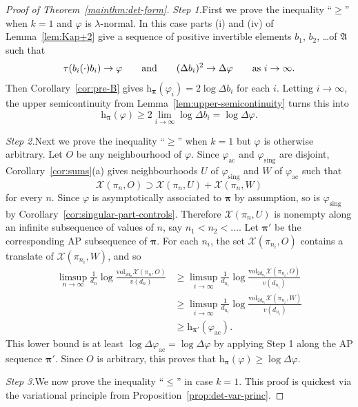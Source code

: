 \documentclass[12pt,a4paper]{article}
\numberwithin{equation}{section}
\theoremstyle{remark}
\renewcommand{\rm}[1]{\mathrm{#1}}
\newcommand{\rmh}{\mathrm{h}}
\newcommand{\X}{\mathcal{X}}
\newcommand{\A}{\mathfrak{A}}
\renewcommand{\phi}{\varphi}
\renewcommand{\l}{\lambda}
\newcommand{\bspi}{\boldsymbol{\pi}}
\newcommand{\vol}{\mathrm{vol}}
\begin{document}
\begin{proof}[Proof of Theorem~\ref{mainthm:det-form}]
\emph{Step 1.}\quad First we prove the inequality ``$\ge$'' when $k=1$ and $\phi$ is $\l$-normal.  In this case parts (i) and (iv) of Lemma~\ref{lem:Kap+2} give a sequence of positive invertible elements $b_1$, $b_2$, \dots of $\A$ such that
\[\tau(b_i(\cdot)b_i) \to \phi \qquad \hbox{and} \qquad (\Delta b_i)^2 \to \Delta \phi \qquad \hbox{as}\ i\to\infty.\]
Then Corollary~\ref{cor:pre-B} gives $\rmh_{\bspi}(\phi_i) = 2\log \Delta b_i$ for each $i$. Letting $i\to \infty$, the upper semicontinuity from Lemma~\ref{lem:upper-semicontinuity} turns this into
\[\rmh_{\bspi}(\phi) \ge 2\lim_{i\to\infty}\log \Delta b_i = \log \Delta \phi.\]

\emph{Step 2.}\quad Next we prove the inequality ``$\ge$'' when $k=1$ but $\phi$ is otherwise arbitrary.  Let $O$ be any neighbourhood of $\phi$.  Since $\phi_{\rm{ac}}$ and $\phi_{\rm{sing}}$ are disjoint,  Corollary~\ref{cor:sums}(a) gives neighbourhoods $U$ of $\phi_{\rm{sing}}$ and $W$ of $\phi_{\rm{ac}}$ such that
\[	\X(\pi_n,O) \supset \X(\pi_n,U) + \X(\pi_n,W)\]
for every $n$.  Since $\phi$ is asymptotically associated to $\bspi$ by assumption, so is $\phi_{\rm{sing}}$ by Corollary~\ref{cor:singular-part-controls}.  Therefore $\X(\pi_n,U)$ is nonempty along an infinite subsequence of values of $n$, say $n_1 < n_2 < \dots$.  Let $\bspi'$ be the corresponding AP subsequence of $\bspi$.  For each $n_i$, the set $\X(\pi_{n_i},O)$ contains a translate of $\X(\pi_{n_i},W)$, and so
\begin{align*}
\limsup_{n\to\infty}\frac{1}{d_n}\log \frac{\vol_{2d_n}\X(\pi_n,O)}{v(d_n)} &\ge\limsup_{i\to\infty}\frac{1}{d_{n_i}}\log \frac{\vol_{2d_{n_i}}\X(\pi_{n_i},O)}{v(d_{n_i})}\\
&\ge \limsup_{i\to\infty}\frac{1}{d_{n_i}}\log \frac{\vol_{2d_{n_i}}\X(\pi_{n_i},W)}{v(d_{n_i})} \\
&\ge \rmh_{\bspi'}(\phi_{\rm{ac}}).
\end{align*}
This lower bound is at least $\log \Delta \phi_{\rm{ac}} = \log\Delta\phi$ by applying Step 1 along the AP sequence $\bspi'$.  Since $O$ is arbitrary, this proves that $\rmh_{\bspi}(\phi)\ge \log \Delta \phi$.

\vspace{7pt}

\emph{Step 3.}\quad We now prove the inequality ``$\le$'' in case $k=1$.  This proof is quickest via the variational principle from Proposition~\ref{prop:det-var-princ}.


\end{proof}
\end{document}
